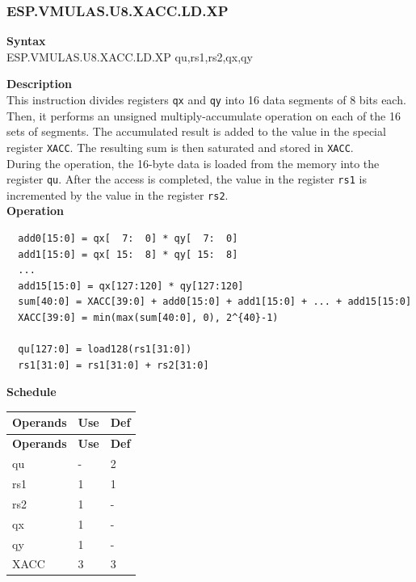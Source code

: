 \newpage
\subsubsection{ESP.VMULAS.U8.XACC.LD.XP}\label{instruction:ESPVMULASU8XACCLDXP}
\textbf{Syntax}\\
ESP.VMULAS.U8.XACC.LD.XP qu,rs1,rs2,qx,qy

\textbf{Description}\\
This instruction divides registers \lstinline{qx} and \lstinline{qy} into 16 data segments of 8 bits each. Then, it performs an unsigned multiply-accumulate operation on each of the 16 sets of segments. The accumulated result is added to the value in the special register \lstinline{XACC}. The resulting sum is then saturated and stored in \lstinline{XACC}.\\
During the operation, the 16-byte data is loaded from the memory into the register \lstinline{qu}. After the access is completed, the value in the register \lstinline{rs1} is incremented by the value in the register \lstinline{rs2}.\\
\textbf{Operation}
\begin{lstlisting}
  add0[15:0] = qx[  7:  0] * qy[  7:  0]
  add1[15:0] = qx[ 15:  8] * qy[ 15:  8]
  ...
  add15[15:0] = qx[127:120] * qy[127:120]
  sum[40:0] = XACC[39:0] + add0[15:0] + add1[15:0] + ... + add15[15:0]
  XACC[39:0] = min(max(sum[40:0], 0), 2^{40}-1)

  qu[127:0] = load128(rs1[31:0])
  rs1[31:0] = rs1[31:0] + rs2[31:0]
\end{lstlisting}

\textbf{Schedule}\\
\begin{longtable}[c]{|l|l|l|}
    \hline
    \rowcolor{lightgray}
    \textbf{Operands} & \textbf{Use} & \textbf{Def} \\\hline
    \endfirsthead
    \hline
    \rowcolor{lightgray}
     \textbf{Operands} & \textbf{Use} & \textbf{Def} \\\hline
    \endhead
    \hline
    \endfoot

    qu & - & 2 \\\hline
    rs1 & 1 & 1 \\\hline
    rs2 & 1 & - \\\hline
     qx & 1 & - \\\hline
     qy & 1 & - \\\hline
     XACC & 3 & 3

\end{longtable}


